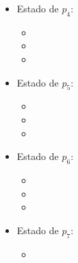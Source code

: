 \begin{multicols}{2}
\begin{itemize}
\begin{itemize}
      \item {}
      
      \item {}
      \end{itemize}

\item Estado de $p_4$:
      \begin{itemize}
      \item {}
      
      \item {}
      
      \item {}
      \end{itemize}

\item Estado de $p_5$:
      \begin{itemize}
      \item {}
      
      \item {}
      
      \item {}
      \end{itemize}

\item Estado de $p_6$:
      \begin{itemize}
      \item {}
      
      \item {}
      
      \item {}
      \end{itemize}

\item Estado de $p_7$:
      \begin{itemize}
      \item {}
      

\end{itemize}
\end{itemize}
\end{multicols}

